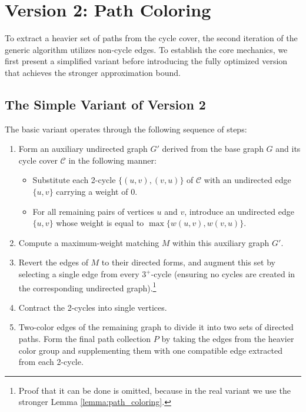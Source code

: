 \section{Version 2: Path Coloring} \label{sec:kps_v2}

To extract a heavier set of paths from the cycle cover, the second iteration of
the generic algorithm utilizes non-cycle edges. To establish the core mechanics,
we first present a simplified variant before introducing the fully optimized
version that achieves the stronger approximation bound.

\subsection{The Simple Variant of Version 2}
The basic variant operates through the following sequence of
steps:\begin{enumerate}[label=\textbf{Step 2\alph*.}, leftmargin=*]
    \item Form an auxiliary undirected graph $G'$ derived from the base graph
    $G$ and its cycle cover $\mathcal{C}$ in the following manner:
    \begin{itemize}
        \item Substitute each 2-cycle $\{(u, v), (v, u)\}$ of $\mathcal{C}$ with
        an undirected edge $\{u, v\}$ carrying a weight of $0$.
        \item For all remaining pairs of vertices $u$ and $v$, introduce an
        undirected edge $\{u, v\}$ whose weight is equal to $\max\{w(u, v), w(v,
        u)\}$.
    \end{itemize}
    \item Compute a maximum-weight matching $M$ within this auxiliary graph
    $G'$.
    \item Revert the edges of $M$ to their directed forms, and augment this set
    by selecting a single edge from every $3^+$-cycle (ensuring no cycles are
    created in the corresponding undirected graph).\footnote{Proof that it can
    be done is omitted, because in the real variant we use the stronger Lemma
    \ref{lemma:path_coloring}.}
    \item Contract the 2-cycles into single vertices.
    \item Two-color edges of the remaining graph to divide it into two sets of
    directed paths. Form the final path collection $P$ by taking the edges from
    the heavier color group and supplementing them with one compatible edge
    extracted from each 2-cycle.
\end{enumerate}

